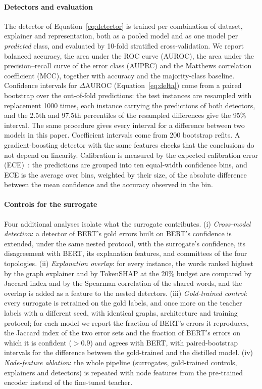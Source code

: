 \documentclass[preprint, times, review, 10pt]{elsarticle}
\begin{document}
\paragraph{Detectors and evaluation}
The detector of Equation~\ref{eq:detector} is trained per combination of dataset, explainer and representation, both as a pooled model and as one model per \emph{predicted} class, and evaluated by 10-fold stratified cross-validation. We report balanced accuracy, the area under the ROC curve (AUROC), the area under the precision--recall curve of the error class (AUPRC) and the Matthews correlation coefficient (MCC), together with accuracy and the majority-class baseline. Confidence intervals for \(\Delta\mathrm{AUROC}\) (Equation~\ref{eq:delta}) come from a paired bootstrap over the out-of-fold predictions: the test instances are resampled with replacement 1000 times, each instance carrying the predictions of both detectors, and the 2.5th and 97.5th percentiles of the resampled differences give the 95\% interval. The same procedure gives every interval for a difference between two models in this paper. Coefficient intervals come from 200 bootstrap refits. A gradient-boosting detector with the same features checks that the conclusions do not depend on linearity. Calibration is measured by the expected calibration error (ECE)~\cite{guo2017calibration}: the predictions are grouped into ten equal-width confidence bins, and ECE is the average over bins, weighted by their size, of the absolute difference between the mean confidence and the accuracy observed in the bin.

\paragraph{Controls for the surrogate}
Four additional analyses isolate what the surrogate contributes. (i) \emph{Cross-model detection}: a detector of BERT's gold errors built on BERT's confidence is extended, under the same nested protocol, with the surrogate's confidence, its disagreement with BERT, its explanation features, and committees of the four topologies. (ii) \emph{Explanation overlap}: for every instance, the words ranked highest by the graph explainer and by TokenSHAP at the 20\% budget are compared by Jaccard index and by the Spearman correlation of the shared words, and the overlap is added as a feature to the nested detectors. (iii) \emph{Gold-trained control}: every surrogate is retrained on the gold labels, and once more on the teacher labels with a different seed, with identical graphs, architecture and training protocol; for each model we report the fraction of BERT's errors it reproduces, the Jaccard index of the two error sets and the fraction of BERT's errors on which it is confident (\(>0.9\)) and agrees with BERT, with paired-bootstrap intervals for the difference between the gold-trained and the distilled model. (iv) \emph{Node-feature ablation}: the whole pipeline (surrogates, gold-trained controls, explainers and detectors) is repeated with node features from the pre-trained encoder instead of the fine-tuned teacher.
\end{document}

